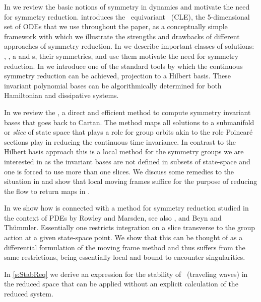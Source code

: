 In  we review the basic notions of symmetry
in dynamics and motivate the need for symmetry reduction.
 introduces the \ equivariant
\cLe\ (CLE), the 5-dimensional set of ODEs that we use
throughout the paper, as a conceptually  simple framework
with which we illustrate the strengths and drawbacks of different
approaches of symmetry reduction.
In  we describe important classes of
solutions: \eqva, \reqva, \po a and \rpo s, their symmetries,
and use them motivate the need for symmetry reduction.
In  we introduce one of the standard tools
by which the continuous symmetry reduction can be achieved,
projection to a Hilbert basis. These invariant polynomial
bases can be algorithmically determined
for both Hamiltonian and dissipative systems.

In  we review the \emph{\mframes}, a direct
and efficient method to compute symmetry invariant bases that
goes back to Cartan. The method maps all solutions to a
submanifold or \emph{slice} of state space that plays a role
for group orbits akin to the role Poincar\'e sections play in
reducing the continuous time invariance. In contrast to the
Hilbert basis approach this is a local method for the
symmetry groups we are interested in as the invariant bases
are not defined in subsets of state-space and one is forced
to use more than one slices. We discuss some remedies to the
situation in 
and show that local moving frames suffice for the purpose of
reducing the flow to return maps in .

In  we show how {\mframes} is
connected with a method for symmetry reduction studied in the
context of PDEs by Rowley and
Marsden, see also
, and Beyn and
Th\"ummler.
Essentially one restricts integration on a slice transverse
to the group action at a given state-space point. We show
that this can be thought of as a differential formulation of
the moving frame method and thus suffers from the same
restrictions, being essentially local and bound to encounter
singularities.

In \ref{s:StabReq} we derive an expression for the stability
of \reqva\ (traveling waves) in the reduced space
that can be applied without an explicit
calculation of the reduced system.
